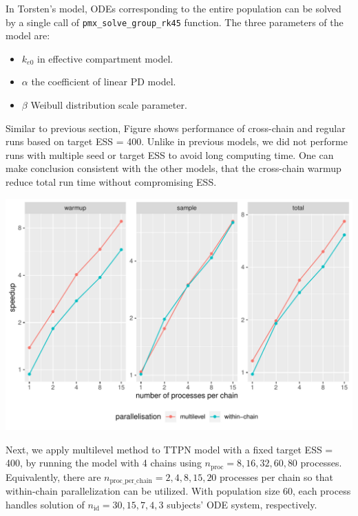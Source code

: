 \documentclass[landscape,a0paper,fontscale=0.5]{baposter} %
\begin{document}
\begin{poster}
{\begin{multicols}{2}
In Torsten's model, ODEs corresponding to the entire
population can be solved by a single call of \texttt{\texttt{pmx\_solve\_group\_rk45}} function. The three parameters of the
model are:
\begin{itemize}
\item \(k_{e0}\) in effective compartment model.
\item \(\alpha\) the coefficient of linear PD model.
\item \(\beta\) Weibull distribution scale parameter.
\end{itemize}

Similar to previous section, Figure shows performance of cross-chain and
regular runs based on target ESS = 400. Unlike in previous models, we
did not performe runs with multiple seed or target ESS to avoid long
computing time. One can make conclusion consistent with the other
models, that the cross-chain warmup reduce total run time without
compromising ESS.

\begin{center}
\includegraphics[width=\linewidth]{./figure/ttpn2_perf_benchmark.pdf}
\end{center}

Next, we apply multilevel method to TTPN model with a fixed target ESS
= 400, by running the model
with 4 chains using \(n_{\text{proc}} = 8, 16, 32, 60, 80\)
processes. Equivalently, there are
\(n_{\text{proc\_per\_chain}} = 2, 4, 8, 15, 20\)
processes per chain so that within-chain parallelization can be utilized.
With population size 60, each process handles solution of
\(n_{\text{id}} = 30, 15, 7, 4, 3\)
subjects' ODE system, respectively.


\end{multicols}}
\end{poster}
\end{document}
